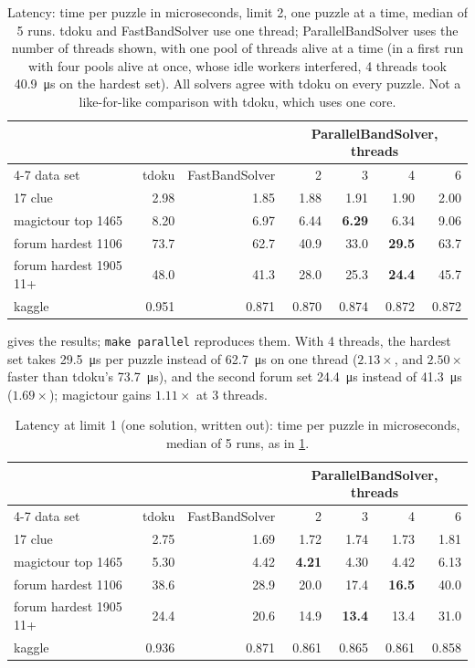 \documentclass[11pt]{article}
\theoremstyle{definition}
\theoremstyle{plain}
\begin{document}
\begin{table}[t]
\centering
\caption{Latency: time per puzzle in microseconds, limit 2, one puzzle at a time, median of 5 runs. tdoku and
FastBandSolver use one thread; ParallelBandSolver uses the number of threads shown, with one pool of threads alive at a time (in a first run with four pools alive at once, whose idle workers interfered,
4 threads took \SI{40.9}{\micro\second} on the hardest set). All solvers agree with tdoku on every puzzle. Not a like-for-like
comparison with tdoku, which uses one core.}
\label{tab:latency}
\footnotesize
\setlength{\tabcolsep}{4pt}
\begin{tabular}{lrrrrrr}
\toprule
 & & & \multicolumn{4}{c}{ParallelBandSolver, threads} \\
\cmidrule(lr){4-7}
data set & tdoku & FastBandSolver & 2 & 3 & 4 & 6 \\
\midrule
17 clue & 2.98 & 1.85 & 1.88 & 1.91 & 1.90 & 2.00 \\
magictour top 1465 & 8.20 & 6.97 & 6.44 & \textbf{6.29} & 6.34 & 9.06 \\
forum hardest 1106 & 73.7 & 62.7 & 40.9 & 33.0 & \textbf{29.5} & 63.7 \\
forum hardest 1905 11+ & 48.0 & 41.3 & 28.0 & 25.3 & \textbf{24.4} & 45.7 \\
kaggle & 0.951 & 0.871 & 0.870 & 0.874 & 0.872 & 0.872 \\
\bottomrule
\end{tabular}
\end{table}

 gives the results; \texttt{make parallel} reproduces them. With 4 threads, the hardest set takes
\SI{29.5}{\micro\second} per puzzle instead of \SI{62.7}{\micro\second} on one thread ($2.13\times$, and $2.50\times$ faster than tdoku's \SI{73.7}{\micro\second}), and the
second forum set \SI{24.4}{\micro\second} instead of \SI{41.3}{\micro\second} ($1.69\times$); magictour gains $1.11\times$ at 3 threads.

\begin{table}[t]
\centering
\caption{Latency at limit 1 (one solution, written out): time per puzzle in microseconds, median of 5 runs, as in
\cref{tab:latency}.}
\label{tab:latency1}
\footnotesize
\setlength{\tabcolsep}{3.5pt}
\begin{tabular}{lrrrrrr}
\toprule
 & & & \multicolumn{4}{c}{ParallelBandSolver, threads} \\
\cmidrule(lr){4-7}
data set & tdoku & FastBandSolver & 2 & 3 & 4 & 6 \\
\midrule
17 clue & 2.75 & 1.69 & 1.72 & 1.74 & 1.73 & 1.81 \\
magictour top 1465 & 5.30 & 4.42 & \textbf{4.21} & 4.30 & 4.42 & 6.13 \\
forum hardest 1106 & 38.6 & 28.9 & 20.0 & 17.4 & \textbf{16.5} & 40.0 \\
forum hardest 1905 11+ & 24.4 & 20.6 & 14.9 & \textbf{13.4} & 13.4 & 31.0 \\
kaggle & 0.936 & 0.871 & 0.861 & 0.865 & 0.861 & 0.858 \\
\bottomrule
\end{tabular}
\end{table}
\end{document}
